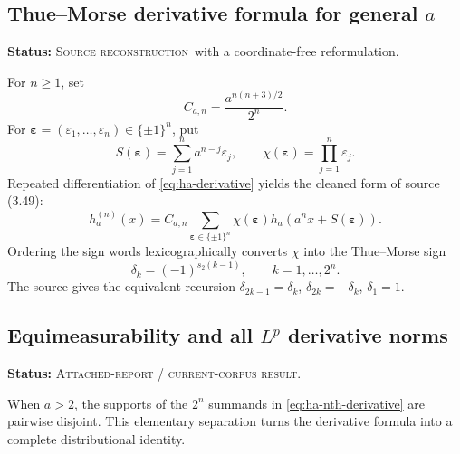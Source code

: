\documentclass[11pt,oneside]{article}
\theoremstyle{definition}
\theoremstyle{remark}
\newcommand{\SourceStatus}{\textcolor{SourceBlue}{\textsc{Source reconstruction}}}
\newcommand{\DraftStatus}{\textcolor{DraftAmber}{\textsc{Attached-report / current-corpus result}}}
\newcommand{\status}[1]{\par\smallskip\noindent\textbf{Status:} #1.\par\smallskip}
\newcommand{\bitsum}{s_2}
\begin{document}
\subsection{Thue--Morse derivative formula for general \texorpdfstring{\(a\)}{a}}
\status{\SourceStatus\ with a coordinate-free reformulation}

For \(n\ge1\), set
\begin{equation}
  C_{a,n}=\frac{a^{n(n+3)/2}}{2^n}.
  \label{eq:Can}
\end{equation}
For \(\boldsymbol\varepsilon=(\varepsilon_1,\ldots,\varepsilon_n)\in\{\pm1\}^n\), put
\begin{equation}
  S(\boldsymbol\varepsilon)=\sum_{j=1}^{n}a^{n-j}\varepsilon_j,
  \qquad
  \chi(\boldsymbol\varepsilon)=\prod_{j=1}^{n}\varepsilon_j.
  \label{eq:shift-sign}
\end{equation}
Repeated differentiation of \eqref{eq:ha-derivative} yields the cleaned form of source (3.49):
\begin{equation}
  h_a^{(n)}(x)=C_{a,n}
  \sum_{\boldsymbol\varepsilon\in\{\pm1\}^n}
  \chi(\boldsymbol\varepsilon)
  h_a\!\left(a^n x+S(\boldsymbol\varepsilon)\right).
  \label{eq:ha-nth-derivative}
\end{equation}
Ordering the sign words lexicographically converts \(\chi\) into the Thue--Morse sign
\begin{equation}
  \delta_k=(-1)^{\bitsum(k-1)},
  \qquad k=1,\ldots,2^n.
  \label{eq:delta-thue-morse}
\end{equation}
The source gives the equivalent recursion \(\delta_{2k-1}=\delta_k\), \(\delta_{2k}=-\delta_k\), \(\delta_1=1\).

\subsection{Equimeasurability and all \texorpdfstring{\(L^p\)}{Lp} derivative norms}
\status{\DraftStatus}

When \(a>2\), the supports of the \(2^n\) summands in \eqref{eq:ha-nth-derivative} are pairwise disjoint.  This elementary separation turns the derivative formula into a complete distributional identity.
\end{document}
